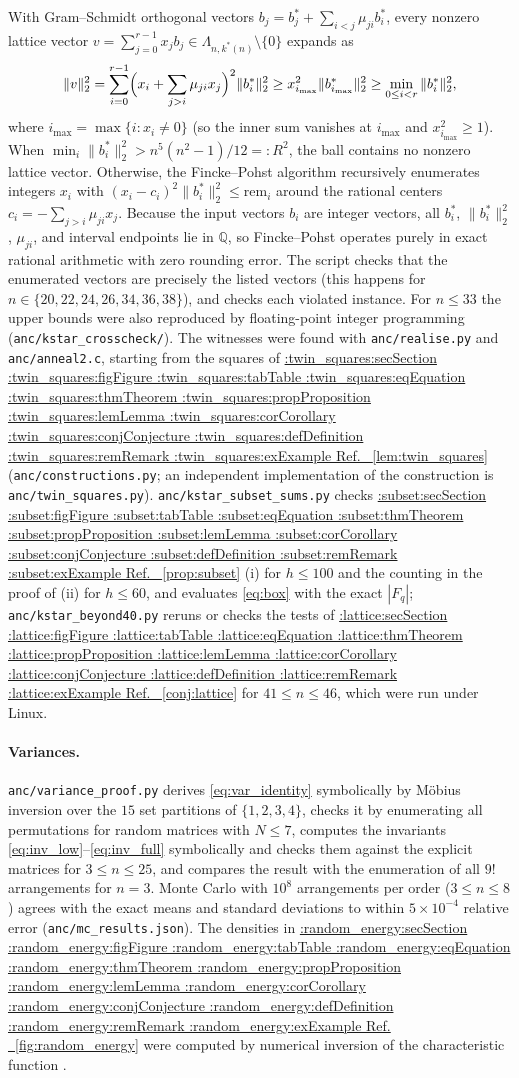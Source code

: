 \documentclass[11pt,a4paper]{article}
\makeatletter
\def\Cref@getprefix#1:#2\relax{#1}
\def\Cref@prefix@sec{sec}
\def\Cref@prefix@fig{fig}
\def\Cref@prefix@tab{tab}
\def\Cref@prefix@eq{eq}
\def\Cref@prefix@thm{thm}
\def\Cref@prefix@prop{prop}
\def\Cref@prefix@lem{lem}
\def\Cref@prefix@cor{cor}
\def\Cref@prefix@conj{conj}
\def\Cref@prefix@def{def}
\def\Cref@prefix@rem{rem}
\def\Cref@prefix@ex{ex}
\def\Cref@type@cap#1{%
  \edef\Cref@tmp{#1}%
  \ifx\Cref@tmp\Cref@prefix@sec Section%
  \else\ifx\Cref@tmp\Cref@prefix@fig Figure%
  \else\ifx\Cref@tmp\Cref@prefix@tab Table%
  \else\ifx\Cref@tmp\Cref@prefix@eq Equation%
  \else\ifx\Cref@tmp\Cref@prefix@thm Theorem%
  \else\ifx\Cref@tmp\Cref@prefix@prop Proposition%
  \else\ifx\Cref@tmp\Cref@prefix@lem Lemma%
  \else\ifx\Cref@tmp\Cref@prefix@cor Corollary%
  \else\ifx\Cref@tmp\Cref@prefix@conj Conjecture%
  \else\ifx\Cref@tmp\Cref@prefix@def Definition%
  \else\ifx\Cref@tmp\Cref@prefix@rem Remark%
  \else\ifx\Cref@tmp\Cref@prefix@ex Example%
  \else Ref.%
  \fi\fi\fi\fi\fi\fi\fi\fi\fi\fi\fi\fi
}
\DeclareRobustCommand{\Cref}[1]{%
  \begingroup
  \edef\Cref@label{#1}%
  \edef\Cref@prefix{\expandafter\Cref@getprefix\Cref@label:\relax}%
  \hyperref[#1]{\Cref@type@cap{\Cref@prefix}~\ref*{#1}}%
  \endgroup
}
\theoremstyle{plain}
\theoremstyle{definition}
\theoremstyle{remark}
\makeatother
\begin{document}
With Gram--Schmidt orthogonal vectors $b_j = b_j^* + \sum_{i<j} \mu_{ji} b_i^*$, every nonzero lattice vector $v = \sum_{j=0}^{r-1} x_j b_j \in \Lambda_{n,k^*(n)} \setminus \{0\}$ expands as
\[
\|v\|_2^2 = \sum_{i=0}^{r-1} \Bigl(x_i + \sum_{j>i} \mu_{ji} x_j\Bigr)^2 \|b_i^*\|_2^2 \ge x_{i_{\max}}^2 \|b_{i_{\max}}^*\|_2^2 \ge \min_{0\le i < r} \|b_i^*\|_2^2 ,
\]
where $i_{\max} = \max\{i : x_i \ne 0\}$ (so the inner sum vanishes at $i_{\max}$ and $x_{i_{\max}}^2 \ge 1$).
When $\min_i \|b_i^*\|_2^2 > n^5(n^2-1)/12 =: R^2$, the ball contains no nonzero lattice vector.
Otherwise, the Fincke--Pohst algorithm recursively enumerates integers $x_i$ with $(x_i - c_i)^2 \|b_i^*\|_2^2 \le \mathrm{rem}_i$ around the rational centers $c_i = -\sum_{j>i} \mu_{ji} x_j$.
Because the input vectors $b_i$ are integer vectors, all $b_i^*$, $\|b_i^*\|_2^2$, $\mu_{ji}$, and interval endpoints lie in $\mathbb{Q}$, so Fincke--Pohst operates purely in exact rational arithmetic with zero rounding error.
The script checks that the enumerated vectors are precisely the listed vectors (this happens for $n\in\{20,22,24,26,34,36,38\}$), and checks each violated instance.
For $n\le33$ the upper bounds were also reproduced by floating-point integer programming (\texttt{anc/kstar\_crosscheck/}).
The witnesses were found with \texttt{anc/realise.py} and \texttt{anc/anneal2.c}, starting from the squares of \Cref{lem:twin_squares} (\texttt{anc/constructions.py}; an independent implementation of the construction is \texttt{anc/twin\_squares.py}).
\texttt{anc/kstar\_subset\_sums.py} checks \Cref{prop:subset}(i) for $h\le100$ and the counting in the proof of (ii) for $h\le60$, and evaluates \eqref{eq:box} with the exact $|F_q|$; \texttt{anc/kstar\_beyond40.py} reruns or checks the tests of \Cref{conj:lattice} for $41\le n\le46$, which were run under Linux.

\paragraph{Variances.}
\texttt{anc/variance\_proof.py} derives \eqref{eq:var_identity} symbolically by M\"obius inversion over the $15$ set partitions of $\{1,2,3,4\}$, checks it by enumerating all permutations for random matrices with $N\le7$, computes the invariants \eqref{eq:inv_low}--\eqref{eq:inv_full} symbolically and checks them against the explicit matrices for $3\le n\le25$, and compares the result with the enumeration of all $9!$ arrangements for $n=3$.
Monte Carlo with $10^8$ arrangements per order ($3\le n\le8$) agrees with the exact means and standard deviations to within $5\times10^{-4}$ relative error (\texttt{anc/mc\_results.json}).
The densities in \Cref{fig:random_energy} were computed by numerical inversion of the characteristic function \cite{imhof1961}.
\end{document}
